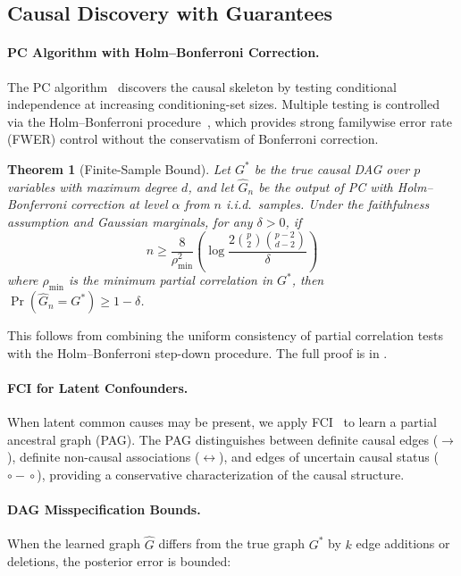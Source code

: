 \documentclass[11pt]{article}
\newtheorem{theorem}{Theorem}
\DeclareMathOperator{\Pr}{Pr}
\begin{document}
\subsection{Causal Discovery with Guarantees}
\label{sec:causal}

\paragraph{PC Algorithm with Holm--Bonferroni Correction.}
The PC algorithm~\cite{spirtes2000} discovers the causal skeleton by testing conditional independence at increasing conditioning-set sizes.
Multiple testing is controlled via the Holm--Bonferroni procedure~\cite{holm1979}, which provides strong familywise error rate (FWER) control without the conservatism of Bonferroni correction.

\begin{theorem}[Finite-Sample Bound]
\label{thm:finite-sample}
Let $G^*$ be the true causal DAG over $p$ variables with maximum degree $d$, and let $\hat{G}_n$ be the output of PC with Holm--Bonferroni correction at level $\alpha$ from $n$ i.i.d.\ samples.
Under the faithfulness assumption and Gaussian marginals, for any $\delta > 0$, if
\[
  n \geq \frac{8}{\rho_{\min}^2}\left(\log\frac{2\binom{p}{2}\binom{p-2}{d-2}}{\delta}\right)
\]
where $\rho_{\min}$ is the minimum partial correlation in $G^*$, then $\Pr(\hat{G}_n = G^*) \geq 1 - \delta$.
\end{theorem}

This follows from combining the uniform consistency of partial correlation tests~\cite{uhler2013} with the Holm--Bonferroni step-down procedure.
The full proof is in .

\paragraph{FCI for Latent Confounders.}
When latent common causes may be present, we apply FCI~\cite{spirtes2000} to learn a partial ancestral graph (PAG).
The PAG distinguishes between definite causal edges ($\to$), definite non-causal associations ($\leftrightarrow$), and edges of uncertain causal status ($\circ\!\!-\!\!\circ$), providing a conservative characterization of the causal structure.

\paragraph{DAG Misspecification Bounds.}
When the learned graph $\hat{G}$ differs from the true graph $G^*$ by $k$ edge additions or deletions, the posterior error is bounded:
\end{document}
